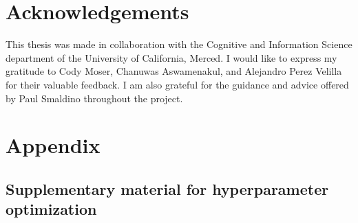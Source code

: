 \documentclass[11pt]{article}
\begin{document}
\section{Acknowledgements}
This thesis was made in collaboration with the Cognitive and Information Science department of the University of California, Merced. I would like to express my gratitude to Cody Moser, Chanuwas Aswamenakul, and Alejandro Perez Velilla for their valuable feedback. I am also grateful for the guidance and advice offered by Paul Smaldino throughout the project.





\appendix
\section{Appendix}
\label{appendix}
\renewcommand\thefigure{\thesection.\arabic{figure}}    
\setcounter{figure}{0}  

\subsection{Supplementary material for hyperparameter optimization}
\end{document}
